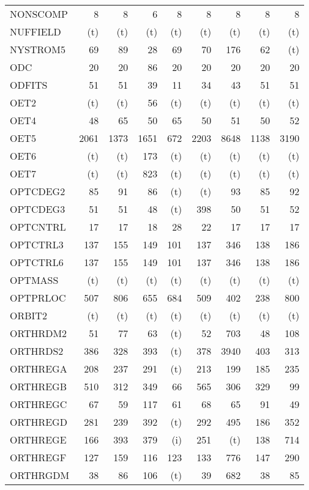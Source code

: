 \documentclass[11pt,twoside]{article}
\begin{document}
{\begin{longtable}[c]{|l|r|r|r|r|r|r|r|r|}
 NONSCOMP & 8 & 8 & 6 & 8 & 8 & 8 & 8 & 8 \\
 NUFFIELD & (t) & (t) & (t) & (t) & (t) & (t) & (t) & (t) \\
 NYSTROM5 & 69 & 89 & 28 & 69 & 70 & 176 & 62 & (t) \\
 ODC & 20 & 20 & 86 & 20 & 20 & 20 & 20 & 20 \\
 ODFITS & 51 & 51 & 39 & 11 & 34 & 43 & 51 & 51 \\
 OET2 & (t) & (t) & 56 & (t) & (t) & (t) & (t) & (t) \\
 OET4 & 48 & 65 & 50 & 65 & 50 & 51 & 50 & 52 \\
 OET5 & 2061 & 1373 & 1651 & 672 & 2203 & 8648 & 1138 & 3190 \\
 OET6 & (t) & (t) & 173 & (t) & (t) & (t) & (t) & (t) \\
 OET7 & (t) & (t) & 823 & (t) & (t) & (t) & (t) & (t) \\
 OPTCDEG2 & 85 & 91 & 86 & (t) & (t) & 93 & 85 & 92 \\
 OPTCDEG3 & 51 & 51 & 48 & (t) & 398 & 50 & 51 & 52 \\
 OPTCNTRL & 17 & 17 & 18 & 28 & 22 & 17 & 17 & 17 \\
 OPTCTRL3 & 137 & 155 & 149 & 101 & 137 & 346 & 138 & 186 \\
 OPTCTRL6 & 137 & 155 & 149 & 101 & 137 & 346 & 138 & 186 \\
 OPTMASS & (t) & (t) & (t) & (t) & (t) & (t) & (t) & (t) \\
 OPTPRLOC & 507 & 806 & 655 & 684 & 509 & 402 & 238 & 800 \\
 ORBIT2 & (t) & (t) & (t) & (t) & (t) & (t) & (t) & (t) \\
 ORTHRDM2 & 51 & 77 & 63 & (t) & 52 & 703 & 48 & 108 \\
 ORTHRDS2 & 386 & 328 & 393 & (t) & 378 & 3940 & 403 & 313 \\
 ORTHREGA & 208 & 237 & 291 & (t) & 213 & 199 & 185 & 235 \\
 ORTHREGB & 510 & 312 & 349 & 66 & 565 & 306 & 329 & 99 \\
 ORTHREGC & 67 & 59 & 117 & 61 & 68 & 65 & 91 & 49 \\
 ORTHREGD & 281 & 239 & 392 & (t) & 292 & 495 & 186 & 352 \\
 ORTHREGE & 166 & 393 & 379 & (i) & 251 & (t) & 138 & 714 \\
 ORTHREGF & 127 & 159 & 116 & 123 & 133 & 776 & 147 & 290 \\
 ORTHRGDM & 38 & 86 & 106 & (t) & 39 & 682 & 38 & 85 \\

\end{longtable}}
\end{document}
